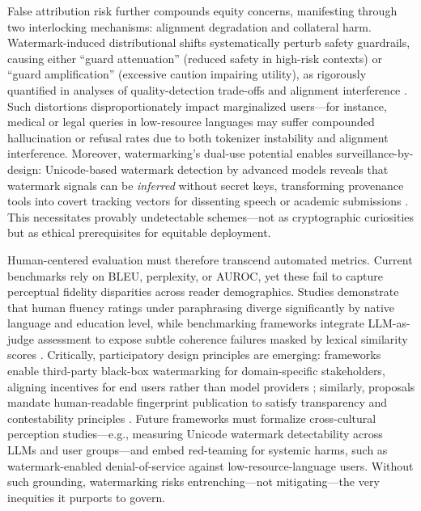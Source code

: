 \documentclass[11pt,a4paper]{article}
\begin{document}
False attribution risk further compounds equity concerns, manifesting through two interlocking mechanisms: alignment degradation and collateral harm. Watermark-induced distributional shifts systematically perturb safety guardrails, causing either ``guard attenuation'' (reduced safety in high-risk contexts) or ``guard amplification'' (excessive caution impairing utility), as rigorously quantified in analyses of quality-detection trade-offs and alignment interference \cite{arxiv:2403.19548,doi:10.18653/v1/2024.findings-naacl.40,arxiv:2306.09194}. Such distortions disproportionately impact marginalized users---for instance, medical or legal queries in low-resource languages may suffer compounded hallucination or refusal rates due to both tokenizer instability and alignment interference. Moreover, watermarking's dual-use potential enables surveillance-by-design: Unicode-based watermark detection by advanced models reveals that watermark signals can be \emph{inferred} without secret keys, transforming provenance tools into covert tracking vectors for dissenting speech or academic submissions \cite{arxiv:2402.10892,doi:10.1145/3611643.3616297}. This necessitates provably undetectable schemes---not as cryptographic curiosities but as ethical prerequisites for equitable deployment.

Human-centered evaluation must therefore transcend automated metrics. Current benchmarks rely on BLEU, perplexity, or AUROC, yet these fail to capture perceptual fidelity disparities across reader demographics. Studies demonstrate that human fluency ratings under paraphrasing diverge significantly by native language and education level, while benchmarking frameworks integrate LLM-as-judge assessment to expose subtle coherence failures masked by lexical similarity scores \cite{arxiv:2306.04634,arxiv:2305.08883,arxiv:2310.15654}. Critically, participatory design principles are emerging: frameworks enable third-party black-box watermarking for domain-specific stakeholders, aligning incentives for end users rather than model providers \cite{arxiv:2209.08773,arxiv:2406.01946}; similarly, proposals mandate human-readable fingerprint publication to satisfy transparency and contestability principles \cite{arxiv:2407.10887,arxiv:2509.03058}. Future frameworks must formalize cross-cultural perception studies---e.g., measuring Unicode watermark detectability across LLMs and user groups---and embed red-teaming for systemic harms, such as watermark-enabled denial-of-service against low-resource-language users. Without such grounding, watermarking risks entrenching---not mitigating---the very inequities it purports to govern.
\end{document}
